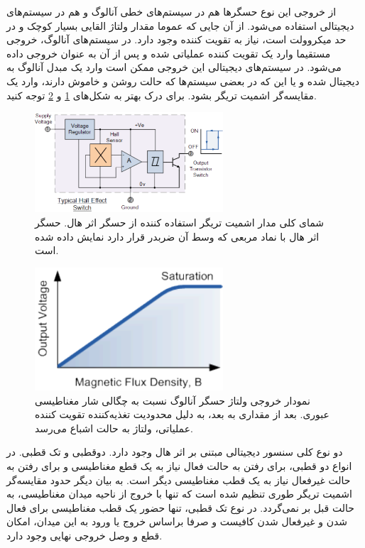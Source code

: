 \documentclass[conference]{IEEEtran-ModifiedForMVIP}
\begin{document}
از خروجی این نوع حسگر‌ها هم در سیستم‌های خطی آنالوگ و هم در سیستم‌های دیجیتالی استفاده می‌شود. از آن جایی که عموما مقدار ولتاژ القایی بسیار کوچک و در حد میکروولت است، نیاز به تقویت کننده وجود دارد. در سیستم‌های آنالوگ، خروجی مستقیما وارد یک تقویت کننده عملیاتی شده و پس از آن به عنوان خروجی داده می‌شود. در سیستم‌های دیجیتالی این خروجی ممکن است وارد یک مبدل آنالوگ به دیجیتال شده و یا این که در بعضی سیستم‌ها که حالت روشن و خاموش دارند، وارد یک مقایسه‌گر اشمیت تریگر
 بشود. برای درک بهتر به شکل‌های
 \ref{fig:2}
 و
 \ref{fig:3}
  توجه کنید.
 
 \begin{figure}[t]
 	
 	\centering 
 	\includegraphics[width=70mm]{Images/2.pdf}
 	\caption{شمای کلی مدار اشمیت تریگر استفاده کننده از حسگر اثر هال. حسگر اثر هال با نماد مربعی که وسط آن ضربدر قرار دارد نمایش داده شده است. 
 		\cite{ele_hall_2013}	
 	}\label{fig:2}
 \end{figure}

\begin{figure}[t]
	
	\centering 
	\includegraphics[width=70mm]{Images/3.pdf}
	\caption{نمودار خروجی ولتاژ حسگر آنالوگ نسبت به چگالی شار مغناطیسی عبوری. بعد از مقداری به بعد، به دلیل محدودیت تغذیه‌کننده تقویت کننده عملیاتی، ولتاژ به حالت اشباع می‌رسد.
		\cite{ele_hall_2013}	
	}\label{fig:3}
\end{figure}
 
 
دو نوع کلی سنسور دیجیتالی مبتنی بر اثر هال وجود دارد. دوقطبی و تک قطبی. در انواع دو قطبی، برای رفتن به حالت فعال نیاز به یک قطع مغناطیسی و برای رفتن به حالت غیرفعال نیاز به یک قطب مغناطیسی دیگر است. به بیان دیگر حدود مقایسه‌گر اشمیت‌ تریگر طوری تنظیم شده است که تنها با خروج از ناحیه میدان مغناطیسی، به حالت قبل بر نمی‌گردد. در نوع تک قطبی، تنها حضور یک قطب مغناطیسی برای فعال شدن و غیرفعال شدن کافیست و صرفا براساس خروج یا ورود به این میدان، امکان قطع و وصل خروجی نهایی وجود دارد.
\end{document}
